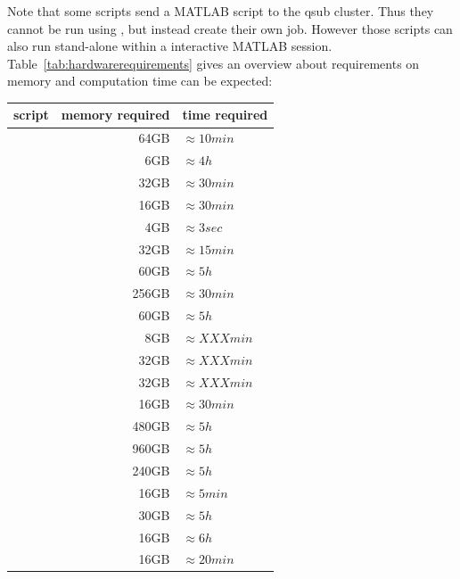 \documentclass[12pt,a4paper]{scrartcl}
\begin{document}
\noindent Note that some scripts send a MATLAB script to the qsub cluster. Thus they cannot be run using \texttt{}, but instead create their own job. However those scripts can also run stand-alone within a interactive MATLAB session.\\

\noindent Table~\ref{tab:hardwarerequirements} gives an overview about requirements on memory and computation time can be expected:

\begin{table}[h]
\centering
\begin{tabular}{l | r | l}
\toprule
script & memory required & time required\\\hline
  \nameref{sh:combsplt} & 64GB & $\approx 10min$ \\\hline
  \nameref{sh:analyzePRF} & 6GB & $\approx 4h$ \\\hline
  \nameref{sh:applydistcorr} & 32GB & $\approx 30min$ \\\hline
  \nameref{sh:coreg} & 16GB & $\approx 30min$ \\\hline
  \nameref{sh:corravg} & 4GB & $\approx 3sec$ \\\hline
  \nameref{sh:distcorr} & 32GB & $\approx 15min$ \\\hline
  \nameref{sh:beamf} & 60GB & $\approx 5h$ \\\hline
  \nameref{sh:selchan} & 256GB & $\approx 30min$ \\\hline
  \nameref{sh:freqVirt} & 60GB & $\approx 5h$ \\\hline
  \nameref{sh:prepFS4EEG} & 8GB & $\approx XXXmin$ \\\hline
  \nameref{sh:prepHM} & 32GB & $\approx XXXmin$ \\\hline
  \nameref{sh:prepSM} & 32GB & $\approx XXXmin$ \\\hline
  \nameref{sh:EEGpreproc} & 16GB & $\approx 30min$ \\\hline
  \nameref{sh:splitbeamf} & 480GB & $\approx 5h$ \\\hline
  \nameref{sh:splitfreqVirt} & 960GB & $\approx 5h$ \\\hline
  \nameref{sh:splitvirtch} & 240GB & $\approx 5h$ \\\hline
  \nameref{sh:timelock} & 16GB & $\approx 5min$ \\\hline
  \nameref{sh:virtch} & 30GB & $\approx 5h$ \\\hline
  \nameref{sh:fsrecon} & 16GB & $\approx 6h$ \\\hline
  \nameref{sh:getLyr} & 16GB & $\approx 20min$ \\\hline

\end{tabular}
\end{table}
\end{document}
